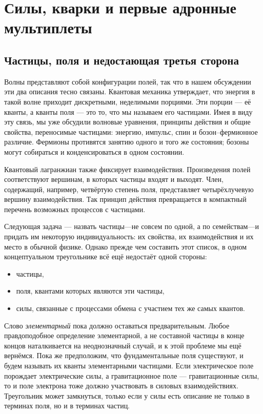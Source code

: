 \chapter{Силы, кварки и первые адронные мультиплеты}

\section{Частицы, поля и недостающая третья сторона}

Волны представляют собой конфигурации полей, так что в нашем обсуждении эти два описания тесно связаны. Квантовая механика утверждает, что энергия в такой волне приходит дискретными, неделимыми порциями. Эти порции — её кванты, а кванты поля — это то, что мы называем его частицами. Имея в виду эту связь, мы уже обсудили волновые уравнения, принципы действия и общие свойства, переносимые частицами: энергию, импульс, спин и бозон--фермионное различие. Фермионы противятся занятию одного и того же состояния; бозоны могут собираться и конденсироваться в одном состоянии.

Квантовый лагранжиан также фиксирует взаимодействия. Произведения полей соответствуют вершинам, в которых частицы входят и выходят. Член, содержащий, например, четвёртую степень поля, представляет четырёхлучевую вершину взаимодействия. Так принцип действия превращается в компактный перечень возможных процессов с частицами.

Следующая задача — назвать частицы---не совсем по одной, а по семействам---и придать им некоторую индивидуальность: их свойства, их взаимодействия и их место в обычной физике. Однако прежде чем составить этот список, в одном концептуальном треугольнике всё ещё недостаёт одной стороны:
\begin{itemize}
\item частицы,
\item поля, квантами которых являются эти частицы,
\item силы, связанные с процессами обмена с участием тех же самых квантов.
\end{itemize}

Слово \emph{элементарный} пока должно оставаться предварительным. Любое правдоподобное определение элементарной, а не составной частицы в конце концов наталкивается на неоднозначный случай, и к этой проблеме мы ещё вернёмся. Пока же предположим, что фундаментальные поля существуют, и будем называть их кванты элементарными частицами. Если электрическое поле порождает электрические силы, а гравитационное поле — гравитационные силы, то и поле электрона тоже должно участвовать в силовых взаимодействиях. Треугольник может замкнуться, только если у силы есть описание не только в терминах поля, но и в терминах частиц.

